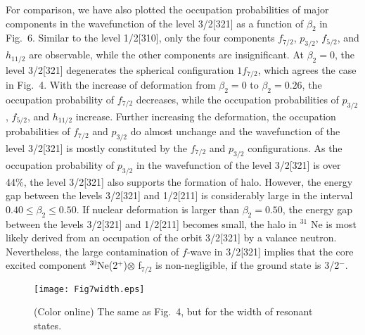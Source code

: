 \documentclass[twocolumn,prc,showpacs,preprintnumbers,superscriptaddress,floatfix]{revtex4}
\begin{document}
For comparison, we have also plotted the occupation probabilities of major
components in the wavefunction of the level 3/2[321] as a function of $\beta
_{2}$ in Fig.~6. Similar to the level 1/2[310], only the four components $%
f_{7/2}$, $p_{3/2}$, $f_{5/2}$, and $h_{11/2}$ are observable, while the
other components are insignificant. At $\beta _{2}=0$, the level 3/2[321]
degenerates the spherical configuration $1f_{7/2}$, which agrees the case in
Fig.~4. With the increase of deformation from $\beta _{2}=0$ to $\beta
_{2}=0.26$, the occupation probability of $f_{7/2}$ decreases, while the
occupation probabilities of $p_{3/2}$, $f_{5/2}$, and $h_{11/2}$ increase.
Further increasing the deformation, the occupation probabilities of $f_{7/2}$
and $p_{3/2}$ do almost unchange and the wavefunction of the level 3/2[321]
is mostly constituted by the $f_{7/2}$ and $p_{3/2}$ configurations.
As the
occupation probability of $p_{3/2}$ in the wavefunction of the level
3/2[321] is over 44\%, the level 3/2[321] also supports the formation of
halo. However, the energy gap between the levels 3/2[321] and 1/2[211] is
considerably large in the interval $0.40\leqslant \beta _{2}\leqslant 0.50$.
If nuclear deformation is larger than $\beta _{2}=0.50$, the energy gap
between the levels 3/2[321] and 1/2[211] becomes small, the halo in $^{31}$%
Ne is most likely derived from an occupation of the orbit 3/2[321] by a
valance neutron. Nevertheless, the large contamination of
$f$-wave in 3/2[321] implies that the core excited component $
^{30}$Ne(2$^+$)$\otimes$ f$_{7/2}$ is non-negligible, if the ground state is
3/2$^-$. 
\begin{figure}[tph]
\centering%
\texttt{[image: Fig7width.eps]}\centering
\caption{(Color online) The same as Fig.~4, but for the width of resonant
states.}
\end{figure}
\end{document}
